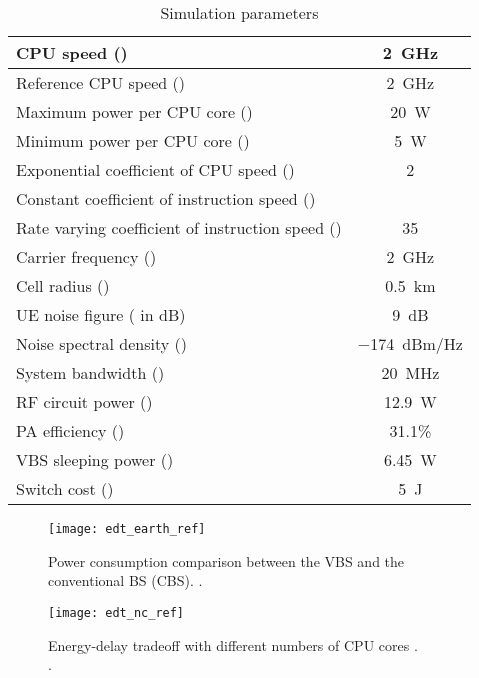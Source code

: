 \documentclass[conference]{IEEEtran}
\begin{document}
\begin{table}[!t]
  \renewcommand{\arraystretch}{1.3}
  \caption{Simulation parameters}
  \label{tab:edt}
  \centering
  \begin{tabular}{lc}
    \hline
    CPU speed () & \SI{2}{GHz} \\
    \hline
    Reference CPU speed () & \SI{2}{GHz} \\
    \hline
    Maximum power per CPU core () & \SI{20}{W} \\
    \hline
    Minimum power per CPU core () & \SI{5}{W} \\
    \hline
    Exponential coefficient of CPU speed () & 2 \\
    \hline
    Constant coefficient of instruction speed () &  \\
    \hline
    Rate varying coefficient of instruction speed () & 35 \\
    \hline
    Carrier frequency () & \SI{2}{GHz} \\
    \hline
    Cell radius () & \SI{0.5}{km} \\
    \hline
    UE noise figure ( in \si{dB}) & \SI{9}{dB} \\
    \hline
    Noise spectral density () & \SI{-174}{dBm/Hz} \\
    \hline
    System bandwidth () & \SI{20}{MHz} \\
    \hline
    RF circuit power () & \SI{12.9}{W} \\
    \hline
    PA efficiency () & 31.1\% \\
    \hline
    VBS sleeping power () & \SI{6.45}{W} \\
    \hline
    Switch cost () & \SI{5}{J} \\
    \hline
  \end{tabular}
\end{table}

\begin{figure}[!t]
  \centering
  \texttt{[image: edt\_earth\_ref]}
  \caption{Power consumption comparison between the VBS and the conventional BS
  (CBS).  .}
  \label{fig:edt-earth}
\end{figure}

\begin{figure}[!t]
  \centering
  \texttt{[image: edt\_nc\_ref]}
  \caption[Energy-delay tradeoff with different numbers of CPU cores.]{Energy-delay tradeoff with different numbers of CPU cores .\\
  .}
  \label{fig:edt-Nc}
\end{figure}
\end{document}
